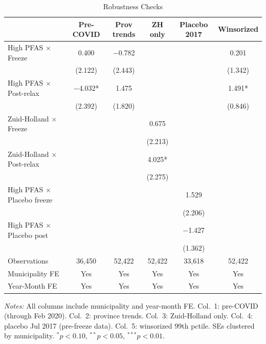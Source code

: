 \begin{table}[htbp]
\centering
\caption{Robustness Checks}
\label{tab:robustness}
\begin{threeparttable}
\small
\begin{tabular}{lccccc}
\hline\hline
 & Pre-COVID & Prov trends & ZH only & Placebo 2017 & Winsorized \\
\hline
High PFAS $\times$ Freeze & 0.400 & $-$0.782 &  &  & 0.201 \\
 & (2.122) & (2.443) &  &  & (1.342) \\
High PFAS $\times$ Post-relax & $-$4.032* & 1.475 &  &  & 1.491* \\
 & (2.392) & (1.820) &  &  & (0.846) \\
Zuid-Holland $\times$ Freeze &  &  & 0.675 &  &  \\
 &  &  & (2.213) &  &  \\
Zuid-Holland $\times$ Post-relax &  &  & 4.025* &  &  \\
 &  &  & (2.275) &  &  \\
High PFAS $\times$ Placebo freeze &  &  &  & 1.529 &  \\
 &  &  &  & (2.206) &  \\
High PFAS $\times$ Placebo post &  &  &  & $-$1.427 &  \\
 &  &  &  & (1.362) &  \\
\hline
Observations & 36,450 & 52,422 & 52,422 & 33,618 & 52,422 \\
Municipality FE & Yes & Yes & Yes & Yes & Yes \\
Year-Month FE & Yes & Yes & Yes & Yes & Yes \\
\hline\hline
\end{tabular}
\begin{tablenotes}[flushleft]
\small
\item \textit{Notes:} All columns include municipality and year-month FE. Col.~1: pre-COVID (through Feb 2020). Col.~2: province trends. Col.~3: Zuid-Holland only. Col.~4: placebo Jul 2017 (pre-freeze data). Col.~5: winsorized 99th pctile. SEs clustered by municipality. $^{*}p < 0.10$, $^{**}p < 0.05$, $^{***}p < 0.01$.
\end{tablenotes}
\end{threeparttable}
\end{table}

